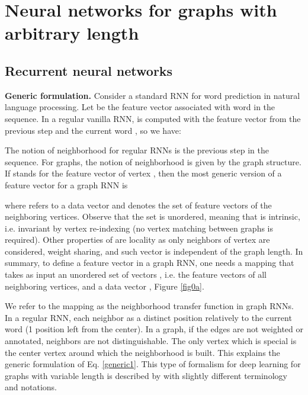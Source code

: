 \documentclass{article} \usepackage{iclr2018_conference,times}
\begin{document}
\section{Neural networks for graphs with arbitrary length}
\label{sec2}


\subsection{Recurrent neural networks}

{\bf Generic formulation.} Consider a standard RNN for word prediction in natural language processing. Let  be the feature vector associated with word  in the sequence. In a regular vanilla RNN,   is computed with the feature vector  from the previous step and the current word , so we have:

The notion of neighborhood for regular RNNs is the previous step in the sequence. For graphs, the notion of neighborhood is given by the graph structure. If  stands for the feature vector of vertex , then the most generic version of a feature vector for a graph RNN is

where  refers to a data vector and  denotes the set of feature vectors of the neighboring vertices. Observe that the set  is unordered, meaning that  is intrinsic, i.e. invariant by vertex re-indexing (no vertex matching between graphs is required). Other properties of  are locality as only neighbors of vertex  are considered, weight sharing, and such vector is independent of the graph length. In summary, to define a feature vector in a graph RNN, one needs a mapping  that takes as input an unordered set of vectors , i.e. the feature vectors of all neighboring vertices, and a data vector , Figure \ref{fig0a}. 

We refer to the mapping  as the neighborhood transfer function in graph RNNs. In a regular RNN, each neighbor as a distinct position relatively to the current word (1 position left from the center). In a graph, if the edges are not weighted or annotated, neighbors are not distinguishable. The only vertex which is special is the center vertex around which the neighborhood is built. This explains the generic formulation of Eq. \eqref{generic1}.  This type of  formalism for deep learning for graphs with variable length is described by \cite{art:ScarselliGoriTsoiHagenbuchnerMonfardini09,art:GilmerSchoenholzRileyVinyalsDahl17Molecule,art:BronsteinBressonSzlamBrunaLeCun17cvpr} with slightly different terminology and notations. 
\end{document}
